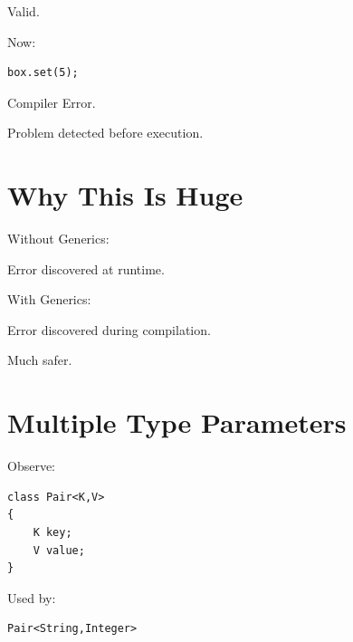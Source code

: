 \documentclass[11pt,a4paper]{book}
\begin{document}

Valid.


Now:

\begin{verbatim}
box.set(5);
\end{verbatim}


Compiler Error.


Problem detected before execution.


\section{Why This Is Huge}

Without Generics:


Error discovered at runtime.


With Generics:


Error discovered during compilation.


Much safer.


\section{Multiple Type Parameters}

Observe:

\begin{verbatim}
class Pair<K,V>
{
    K key;
    V value;
}
\end{verbatim}


Used by:

\begin{verbatim}
Pair<String,Integer>
\end{verbatim}
\end{document}
